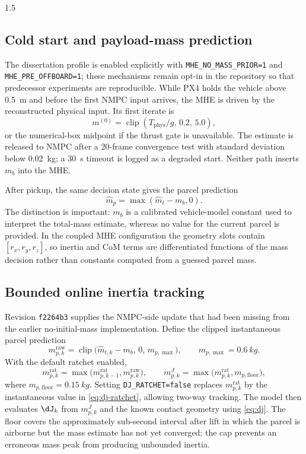 \begin{spacing}{1.5}
\subsection{Cold start and payload-mass prediction}

The dissertation profile is enabled explicitly with
\texttt{MHE\_NO\_MASS\_PRIOR=1} and
\texttt{MHE\_PRE\_OFFBOARD=1}; these mechanisms remain opt-in in the
repository so that predecessor experiments are reproducible. While PX4 holds the vehicle above
\SI{0.5}{m} and before the first NMPC input arrives, the MHE is driven by
the reconstructed physical input. Its first iterate is
\begin{equation}
m^{(0)}=\operatorname{clip}(T_{\mathrm{phys}}/g,\,0.2,\,5.0),
\end{equation}
or the numerical-box midpoint if the thrust gate is unavailable. The
estimate is released to NMPC after a 20-frame convergence test with
standard deviation below \SI{0.02}{kg}; a \SI{30}{s} timeout is logged
as a degraded start. Neither path inserts $m_b$ into the MHE.

After pickup, the same decision state gives the parcel prediction
\begin{equation}
\hat m_p=\max(\hat m_t-m_b,0).
\label{eq:framework-payload}
\end{equation}
The distinction is important: $m_b$ is a calibrated vehicle-model
constant used to interpret the total-mass estimate, whereas no value for
the current parcel is provided. In the coupled MHE configuration the
geometry slots contain $[r_x,r_y,r_z]$, so inertia and CoM terms are
differentiated functions of the mass decision rather than constants
computed from a guessed parcel mass.

\subsection{Bounded online inertia tracking}

Revision \texttt{f2264b3} supplies the NMPC-side update that had been
missing from the earlier no-initial-mass implementation. Define the
clipped instantaneous parcel prediction
\begin{equation}
m^{\mathrm{raw}}_{p,k}=\operatorname{clip}
\bigl(\hat m_{t,k}-m_b,\,0,\,m_{p,\max}\bigr),
\qquad m_{p,\max}=\SI{0.6}{kg}.
\label{eq:dj-raw}
\end{equation}
With the default ratchet enabled,
\begin{equation}
m^{\mathrm{rat}}_{p,k}=\max
\bigl(m^{\mathrm{rat}}_{p,k-1},m^{\mathrm{raw}}_{p,k}\bigr),
\qquad
m^J_{p,k}=\max\bigl(m^{\mathrm{rat}}_{p,k},m_{p,\mathrm{floor}}\bigr),
\label{eq:dj-ratchet}
\end{equation}
where $m_{p,\mathrm{floor}}=\SI{0.15}{kg}$. Setting
\texttt{DJ\_RATCHET=false} replaces $m^{\mathrm{rat}}_{p,k}$ by the
instantaneous value in \eqref{eq:dj-ratchet}, allowing two-way tracking.
The model then evaluates $\dJ_k$ from $m^J_{p,k}$ and the known contact
geometry using \eqref{eq:dj}. The floor covers the approximately
sub-second interval after lift in which the parcel is airborne but the
mass estimate has not yet converged; the cap prevents an erroneous mass
peak from producing unbounded inertia.


\end{spacing}
